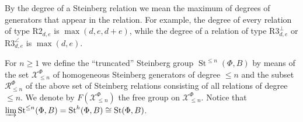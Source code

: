 \documentclass[oneside, 8pt]{amsart}
\theoremstyle{remark}
\theoremstyle{definition}
\numberwithin{lemma}{section}
\numberwithin{prop}{section}
\numberwithin{corollary}{section}
\numberwithin{externaltheorem}{section}
\DeclareMathOperator{\St}{St}
\numberwithin{equation}{section}
\begin{document}
By the degree of a Steinberg relation we mean the maximum of degrees of generators that appear in the relation.
For example, the degree of every relation of type $\text{R2}_{d,e}$ is $\max(d,e,d+e)$, while the degree of a relation of type $\text{R3}^\bot_{d,e}$ or $\text{R3}^\angle_{d,e}$ is $\max(d,e)$.

For $n\geq 1$ we define the ``truncated'' Steinberg group $\St^{\leq n}(\Phi, B)$ by means of the set $\mathcal{X}_{\leq n}^\Phi$ of homogeneous Steinberg generators of degree $\leq n$ and the subset $\mathcal{R}_{\leq n}^\Phi$ of the above set of Steinberg relations consisting of all relations of degree $\leq n$.  We denote by $F(\mathcal{X}^\Phi_{\leq n})$ the free group on $\mathcal{X}^\Phi_{\leq n}$. Notice that $\varinjlim\limits \St^{\leq n}(\Phi, B) = \St^h(\Phi, B) \cong \St(\Phi, B)$.
\end{document}
